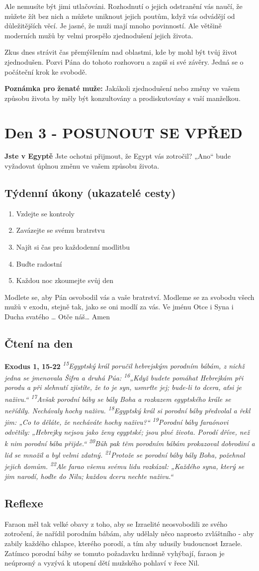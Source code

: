 \documentclass[11pt]{article}
\newcommand{\zacatekPrvniTyden}{
  \textbf{Jste v Egyptě} \newline
  Jste ochotni přijmout, že Egypt vás zotročil? „Ano“ bude vyžadovat úplnou změnu ve vašem způsobu života.

\subsection*{Týdenní úkony (ukazatelé cesty)}
\begin{enumerate}
  \item Vzdejte se kontroly
  \item Zavázejte se svému bratrstvu
  \item Najít si čas pro každodenní modlitbu
  \item Buďte radostní
  \item Každou noc zkoumejte svůj den
\end{enumerate}
Modlete se, aby Pán osvobodil vás a vaše bratrství. \newline
Modleme se za svobodu všech mužů v exodu, stejně tak, jako se oni modlí za vás.\newline
Ve jménu Otce i Syna i Ducha svatého …  Otče náš… Amen
}
\begin{document}
Ale nemusíte být jimi utlačováni. Rozhodnutí o jejich odstranění vás naučí, že můžete žít bez nich a můžete uniknout jejich poutům, když vás odvádějí od důležitějších věcí.
Je jasné, že muži mají mnoho povinností. Ale většině moderních mužů by velmi prospělo zjednodušení jejich života.

Zkus dnes strávit čas přemýšlením nad oblastmi, kde by mohl být tvůj život zjednodušen. Pozvi Pána do tohoto rozhovoru a zapiš si své závěry. Jedná se o počáteční krok ke svobodě.

\textbf{Poznámka pro ženaté muže:} Jakákoli zjednodušení nebo změny ve vašem způsobu života by měly být konzultovány a prodiskutovány s vaší manželkou.

\newpage
\section{Den 3 - POSUNOUT SE VPŘED}
\zacatekPrvniTyden
\subsection*{Čtení na den}
\textbf{Exodus 1, 15-22}
\newline
\textit{
\textsuperscript{15}Egyptský král poručil hebrejským porodním bábám, z nichž jedna se jmenovala Šifra a druhá Púa:
\textsuperscript{16}„Když budete pomáhat Hebrejkám při porodu a při slehnutí zjistíte, že to je syn, usmrťte jej; bude-li to dcera, aťsi je naživu.“
\textsuperscript{17}Avšak porodní báby se bály Boha a rozkazem egyptského krále se neřídily. Nechávaly hochy naživu.
\textsuperscript{18}Egyptský král si porodní báby předvolal a řekl jim: „Co to děláte, že necháváte hochy naživu?“
\textsuperscript{19}Porodní báby faraónovi odvětily: „Hebrejky nejsou jako ženy egyptské; jsou plné života. Porodí dříve, než k nim porodní bába přijde.“
\textsuperscript{20}Bůh pak těm porodním bábám prokazoval dobrodiní a lid se množil a byl velmi zdatný.
\textsuperscript{21}Protože se porodní báby bály Boha, požehnal jejich domům.
\textsuperscript{22}Ale farao všemu svému lidu rozkázal: „Každého syna, který se jim narodí, hoďte do Nilu; každou dceru nechte naživu.“
}

\subsection*{Reflexe}

Faraon měl tak velké obavy z toho, aby se Izraelité neosvobodili ze svého zotročení, že nařídil porodním bábám, aby udělaly něco naprosto zvláštního - aby zabily každého chlapce, kterého porodí, a tím aby udusily budoucnost Izraele. Zatímco porodní báby se tomuto požadavku hrdinně vyhýbají, faraon je neúprosný a vyzývá k utopení dětí mužského pohlaví v řece Nil.
\end{document}
